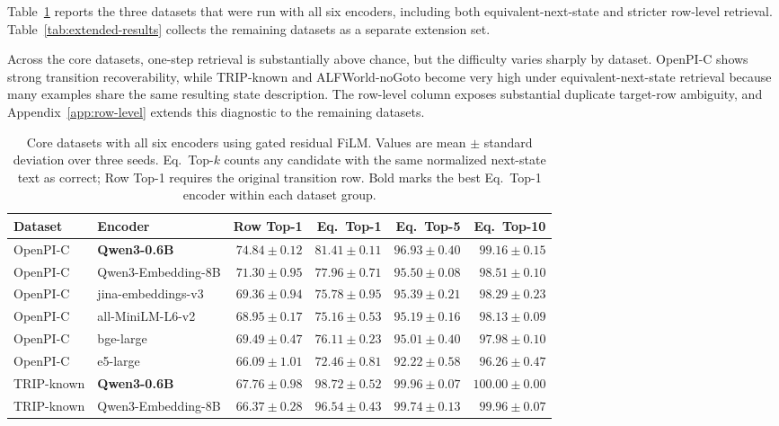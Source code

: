 \documentclass{article}
\begin{document}
Table~\ref{tab:core-results} reports the three datasets that were run with all six encoders, including both equivalent-next-state and stricter row-level retrieval. Table~\ref{tab:extended-results} collects the remaining datasets as a separate extension set.

Across the core datasets, one-step retrieval is substantially above chance, but the difficulty varies sharply by dataset. OpenPI-C shows strong transition recoverability, while TRIP-known and ALFWorld-noGoto become very high under equivalent-next-state retrieval because many examples share the same resulting state description. The row-level column exposes substantial duplicate target-row ambiguity, and Appendix~\ref{app:row-level} extends this diagnostic to the remaining datasets.

\begin{table}[t]
  \centering
  \caption{Core datasets with all six encoders using gated residual FiLM. Values are mean $\pm$ standard deviation over three seeds. Eq.\ Top-$k$ counts any candidate with the same normalized next-state text as correct; Row Top-1 requires the original transition row. Bold marks the best Eq.\ Top-1 encoder within each dataset group.}
  \label{tab:core-results}
  \tiny
  \setlength{\tabcolsep}{2pt}
  \begin{tabular}{llrrrr}
    \toprule
    Dataset & Encoder & Row Top-1 & Eq.\ Top-1 & Eq.\ Top-5 & Eq.\ Top-10 \\
    \midrule
    OpenPI-C & \textbf{Qwen3-0.6B} & $74.84{\pm}0.12$ & $\mathbf{81.41{\pm}0.11}$ & $96.93{\pm}0.40$ & $99.16{\pm}0.15$ \\
    OpenPI-C & Qwen3-Embedding-8B & $71.30{\pm}0.95$ & $77.96{\pm}0.71$ & $95.50{\pm}0.08$ & $98.51{\pm}0.10$ \\
    OpenPI-C & jina-embeddings-v3 & $69.36{\pm}0.94$ & $75.78{\pm}0.95$ & $95.39{\pm}0.21$ & $98.29{\pm}0.23$ \\
    OpenPI-C & all-MiniLM-L6-v2 & $68.95{\pm}0.17$ & $75.16{\pm}0.53$ & $95.19{\pm}0.16$ & $98.13{\pm}0.09$ \\
    OpenPI-C & bge-large & $69.49{\pm}0.47$ & $76.11{\pm}0.23$ & $95.01{\pm}0.40$ & $97.98{\pm}0.10$ \\
    OpenPI-C & e5-large & $66.09{\pm}1.01$ & $72.46{\pm}0.81$ & $92.22{\pm}0.58$ & $96.26{\pm}0.47$ \\
    \midrule
    TRIP-known & \textbf{Qwen3-0.6B} & $67.76{\pm}0.98$ & $\mathbf{98.72{\pm}0.52}$ & $99.96{\pm}0.07$ & $100.00{\pm}0.00$ \\
    TRIP-known & Qwen3-Embedding-8B & $66.37{\pm}0.28$ & $96.54{\pm}0.43$ & $99.74{\pm}0.13$ & $99.96{\pm}0.07$ \\

\end{tabular}
\end{table}
\end{document}
